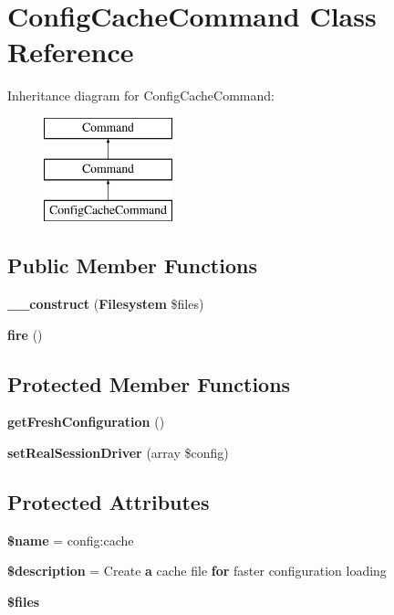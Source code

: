 \section{Config\+Cache\+Command Class Reference}
\label{class_illuminate_1_1_foundation_1_1_console_1_1_config_cache_command}
Inheritance diagram for Config\+Cache\+Command\+:\begin{figure}[H]
\begin{center}
\leavevmode
\includegraphics[height=3.000000cm]{class_illuminate_1_1_foundation_1_1_console_1_1_config_cache_command}
\end{center}
\end{figure}
\subsection*{Public Member Functions}
\begin{DoxyCompactItemize}
\item 
{\bf \+\_\+\+\_\+construct} ({\bf Filesystem} \$files)
\item 
{\bf fire} ()
\end{DoxyCompactItemize}
\subsection*{Protected Member Functions}
\begin{DoxyCompactItemize}
\item 
{\bf get\+Fresh\+Configuration} ()
\item 
{\bf set\+Real\+Session\+Driver} (array \$config)
\end{DoxyCompactItemize}
\subsection*{Protected Attributes}
\begin{DoxyCompactItemize}
\item 
{\bf \$name} = \textquotesingle{}config\+:cache\textquotesingle{}
\item 
{\bf \$description} = \textquotesingle{}Create {\bf a} cache file {\bf for} faster configuration loading\textquotesingle{}
\item 
{\bf \$files}
\end{DoxyCompactItemize}


